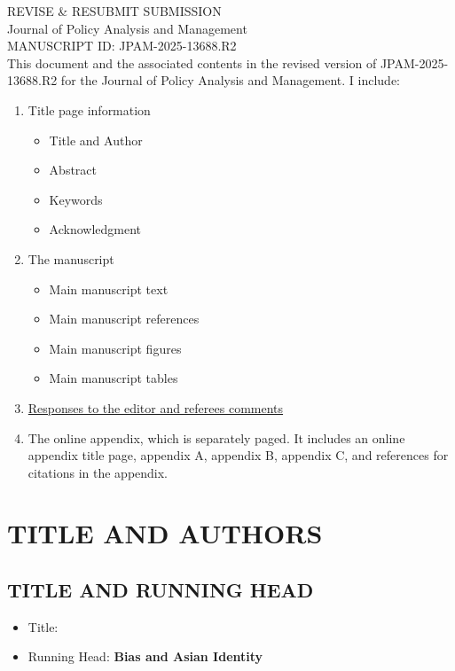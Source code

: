 \documentclass[12pt,english]{article}
\begin{document}
\thispagestyle{empty}
\begingroup
  \doublespacing
  \centering
  \LARGE REVISE \& RESUBMIT SUBMISSION\\[0.25em]
  \LARGE Journal of Policy Analysis and Management \\[0.25em]
  \LARGE MANUSCRIPT ID: JPAM-2025-13688.R2 \\[1.0em]
\endgroup
This document and the associated contents in the revised version of JPAM-2025-13688.R2 for the Journal of Policy Analysis and Management. I include:
\begin{enumerate}
    \item Title page information
    \begin{itemize}
        \item Title and Author
        \item Abstract
        \item Keywords
        \item Acknowledgment
    \end{itemize}
    \item The manuscript
    \begin{itemize}
        \item Main manuscript text
        \item Main manuscript references
        \item Main manuscript figures
        \item Main manuscript tables
    \end{itemize}  
    \item \hyperref[rr:responses]{Responses to the editor and referees comments}
    \item The online appendix, which is separately paged. It includes an online appendix title page, appendix A, appendix B, appendix C, and references for citations in the appendix.
\end{enumerate}
\clearpage



\setcounter{page}{1}

\section*{TITLE AND AUTHORS}
\subsection*{TITLE AND RUNNING HEAD}
\begin{itemize}[label={}, leftmargin=*]
    \item Title: \textbf{\PAPERTITLE}
    \item Running Head:  \textbf{Bias and Asian Identity}
\end{itemize}
\end{document}
